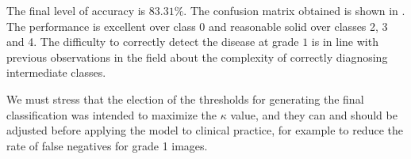 The final level of accuracy is \( 83.31 \% \). The confusion matrix obtained is shown in . The performance is excellent over class 0 and reasonable solid over classes 2, 3 and 4. The difficulty to correctly detect the disease at grade \( 1 \) is in line with previous observations in the field about the complexity of correctly diagnosing intermediate classes. 

We must stress that the election of the thresholds for generating the final classification was intended to maximize the \( \kappa \) value, and they can and should be adjusted before applying the model to clinical practice, for example to reduce the rate of false negatives for grade 1 images.